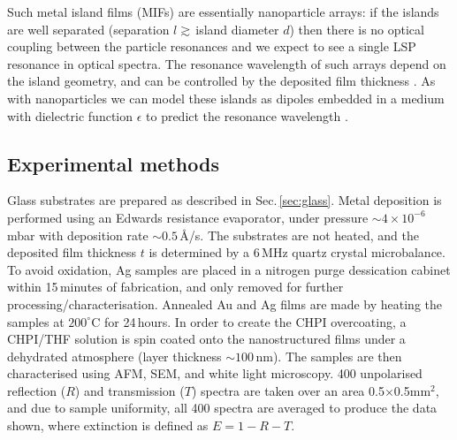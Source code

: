 Such metal island films (MIFs) are essentially nanoparticle arrays: if the islands are well separated (separation $l \gtrsim\,	$island diameter $d$) then there is no optical coupling between the particle resonances and we expect to see a single LSP resonance in optical spectra. The resonance wavelength of such arrays depend on the island geometry, and can be controlled by the deposited film thickness \cite{Walter2006, Sennett1950, Gupta2002, Gadenne2002, Lee1992}. As with nanoparticles we can model these islands as dipoles embedded in a medium with dielectric function $\epsilon$ to predict the resonance wavelength \cite{Yamaguchi1960, Yamaguchi1972, Yamaguchi1973, Doremus1966}.

\subsection{Experimental methods}
Glass substrates are prepared as described in Sec.\,\ref{sec:glass}. Metal deposition is performed using an Edwards resistance evaporator, under pressure $\sim4\times10^{-6}$\,mbar with deposition rate $\sim0.5$\,\AA/s. The substrates are not heated, and the deposited film thickness $t$ is determined by a 6\,MHz quartz crystal microbalance. To avoid oxidation, Ag samples are placed in a nitrogen purge dessication cabinet within 15\,minutes of fabrication, and only removed for further processing/characterisation. Annealed Au and Ag films are made by heating the samples at $200^{\circ}$C for 24\,hours. In order to create the CHPI overcoating, a CHPI/THF solution is spin coated onto the nanostructured films under a dehydrated atmosphere (layer thickness $\sim100$\,nm). The samples are then characterised using AFM, SEM, and white light microscopy. 400 unpolarised reflection ($R$) and transmission ($T$) spectra are taken over an area 0.5$\times$0.5mm$^{2}$, and due to sample uniformity, all 400 spectra are averaged to produce the data shown, where extinction is defined as $E=1-R-T$.

